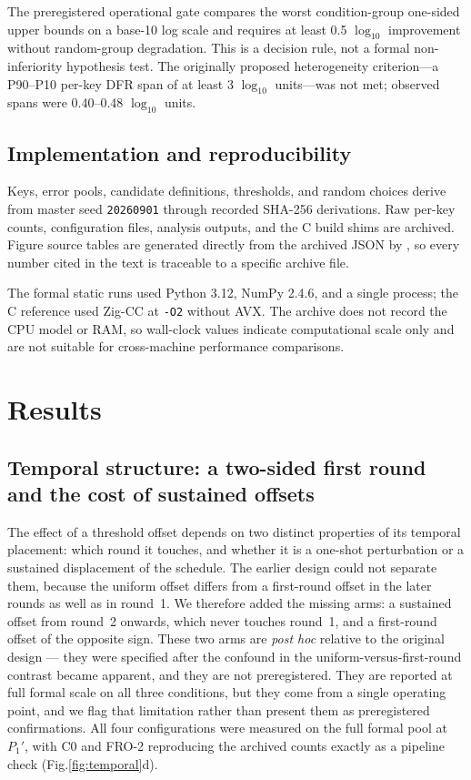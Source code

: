 \documentclass[lettersize,journal]{IEEEtran}
\begin{document}
The preregistered operational gate compares the worst condition-group one-sided upper bounds on a base-10 log scale and requires at least 0.5 $\log_{10}$ improvement without random-group degradation. This is a decision rule, not a formal non-inferiority hypothesis test. The originally proposed heterogeneity criterion---a P90--P10 per-key DFR span of at least 3 $\log_{10}$ units---was not met; observed spans were 0.40--0.48 $\log_{10}$ units.

\subsection{Implementation and reproducibility}

Keys, error pools, candidate definitions, thresholds, and random choices derive from master seed \texttt{20260901} through recorded SHA-256 derivations. Raw per-key counts, configuration files, analysis outputs, and the C build shims are archived. Figure source tables are generated directly from the archived JSON by , so every number cited in the text is traceable to a specific archive file.

The formal static runs used Python 3.12, NumPy 2.4.6, and a single process; the C reference used Zig-CC at \texttt{-O2} without AVX. The archive does not record the CPU model or RAM, so wall-clock values indicate computational scale only and are not suitable for cross-machine performance comparisons.

\section{Results}\label{sec:results}

\subsection{Temporal structure: a two-sided first round and the cost of sustained offsets}\label{sec:temporal}

The effect of a threshold offset depends on two distinct properties of its temporal placement: which round it touches, and whether it is a one-shot perturbation or a sustained displacement of the schedule. The earlier design could not separate them, because the uniform offset differs from a first-round offset in the later rounds as well as in round~1. We therefore added the missing arms: a sustained offset from round~2 onwards, which never touches round~1, and a first-round offset of the opposite sign. These two arms are \emph{post hoc} relative to the original design --- they were specified after the confound in the uniform-versus-first-round contrast became apparent, and they are not preregistered. They are reported at full formal scale on all three conditions, but they come from a single operating point, and we flag that limitation rather than present them as preregistered confirmations. All four configurations were measured on the full formal pool at $P_1'$, with C0 and FRO-2 reproducing the archived counts exactly as a pipeline check (Fig.\ref{fig:temporal}d).
\end{document}
